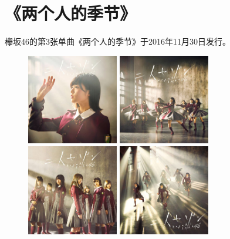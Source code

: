 ﻿
\chapter{《两个人的季节》}

欅坂46的第3张单曲《两个人的季节》于2016年11月30日发行。
\\

\begin{figure}[htp]
  \centering
  {\includegraphics[width=40mm]{images/single-3/3-1.jpg}}
  {\includegraphics[width=40mm]{images/single-3/3-2.jpg}}
  \\
  {\includegraphics[width=40mm]{images/single-3/3-3.jpg}}
  {\includegraphics[width=40mm]{images/single-3/3-4.jpg}}
\end{figure}


\thispagestyle{empty} %
\clearpage





             \clearpage
   \clearpage
             \clearpage
       \clearpage
           \clearpage
                \clearpage


